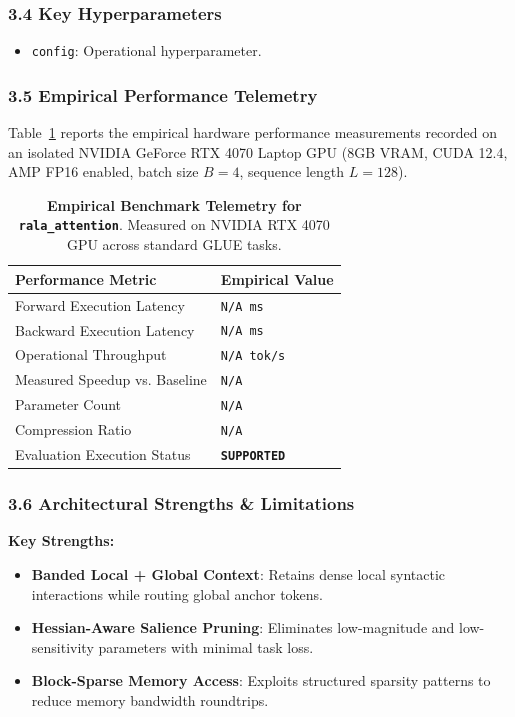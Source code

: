 \subsubsection*{3.4 Key Hyperparameters}
\begin{itemize}
    \item \texttt{config}: Operational hyperparameter.
\end{itemize}

\subsubsection*{3.5 Empirical Performance Telemetry}
Table~\ref{tab:telemetry_rala\_attention} reports the empirical hardware performance measurements recorded on an isolated NVIDIA GeForce RTX 4070 Laptop GPU (8GB VRAM, CUDA 12.4, AMP FP16 enabled, batch size $B=4$, sequence length $L=128$).

\begin{table}[h]
\centering
\small
\caption{\textbf{Empirical Benchmark Telemetry for \texttt{rala\_attention}}. Measured on NVIDIA RTX 4070 GPU across standard GLUE tasks.}
\label{tab:telemetry_rala\_attention}
\begin{tabularx}{\columnwidth}{lX}
\toprule
\textbf{Performance Metric} & \textbf{Empirical Value} \\
\midrule
Forward Execution Latency & \texttt{N/A ms} \\
Backward Execution Latency & \texttt{N/A ms} \\
Operational Throughput & \texttt{N/A tok/s} \\
Measured Speedup vs. Baseline & \texttt{N/A} \\
Parameter Count & \texttt{N/A} \\
Compression Ratio & \texttt{N/A} \\
Evaluation Execution Status & \textbf{\texttt{SUPPORTED}} \\
\bottomrule
\end{tabularx}
\end{table}

\subsubsection*{3.6 Architectural Strengths \& Limitations}
\textbf{Key Strengths:}
\begin{itemize}
    \item \textbf{Banded Local + Global Context}: Retains dense local syntactic interactions while routing global anchor tokens.
    \item \textbf{Hessian-Aware Salience Pruning}: Eliminates low-magnitude and low-sensitivity parameters with minimal task loss.
    \item \textbf{Block-Sparse Memory Access}: Exploits structured sparsity patterns to reduce memory bandwidth roundtrips.
\end{itemize}

